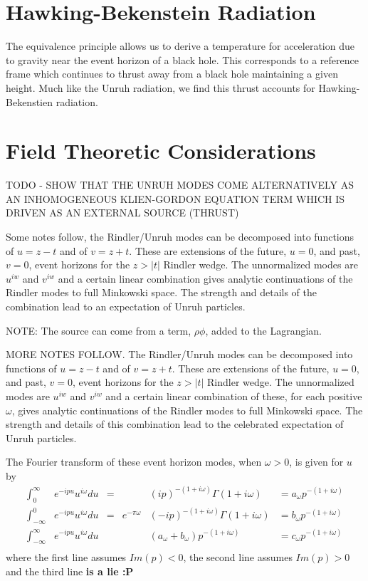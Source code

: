 \documentclass[12pt,a4paper]{article}
\begin{document}
\section{Hawking-Bekenstein Radiation}

The equivalence principle allows us to derive a temperature for acceleration due to gravity near the event horizon of a black hole.  This corresponds to a reference frame which continues to thrust away from a black hole maintaining a given height.  Much like the Unruh radiation, we find this thrust accounts for Hawking-Bekenstien radiation.

\section{Field Theoretic Considerations}
TODO - SHOW THAT THE UNRUH MODES COME ALTERNATIVELY AS AN INHOMOGENEOUS KLIEN-GORDON EQUATION TERM WHICH IS DRIVEN AS AN EXTERNAL SOURCE (THRUST)
\cite{beisert}

Some notes follow, the Rindler/Unruh modes can be decomposed into functions of $u = z-t$ and of $v = z+t$.  These are extensions of the future, $u=0$, and past, $v=0$, event horizons for the $z>|t|$ Rindler wedge.  The unnormalized modes are $u^{iw}$ and $v^{iw}$ and a certain linear combination gives analytic continuations of the Rindler modes to full Minkowski space.  The strength and details of the combination lead to an expectation of Unruh particles.

NOTE: The source can come from a term, $\rho \phi$, added to the Lagrangian.


MORE NOTES FOLLOW. The Rindler/Unruh modes can be decomposed into functions of $u = z-t$ and of $v = z+t$.  These are extensions of the future, $u=0$, and past, $v=0$, event horizons for the $z>|t|$ Rindler wedge.  The unnormalized modes are $u^{iw}$ and $v^{iw}$ and a certain linear combination of these, for each positive $\omega$, gives analytic continuations of the Rindler modes to full Minkowski space.  The strength and details of this combination lead to the celebrated expectation of Unruh particles.

The Fourier transform of these event horizon modes, when $\omega > 0$, is given for $u$ by
\[
\begin{aligned}
\int_0^\infty         & e^{-i p u} u^{i\omega} du &=&             &(i p)^{-(1 + i\omega)}\Gamma(1 + i\omega)              & = a_\omega p^{-(1 + i\omega)} \\
\int_{-\infty}^0       & e^{-i p u} u^{i\omega} du &=& e^{-\pi\omega}&(-i p)^{-(1 + i\omega)}\Gamma(1 + i\omega) & = b_\omega p^{-(1 + i\omega)} \\
\int_{-\infty}^\infty   & e^{-i p u} u^{i\omega} du & &            & (a_\omega + b_\omega) p^{-(1 + i\omega)}               & = c_\omega p^{-(1 + i\omega)} \\
\end{aligned}
\]
where the first line assumes $Im(p) < 0$, the second line assumes $Im(p) > 0$ and the third line {\bf is a lie :P}
\end{document}
